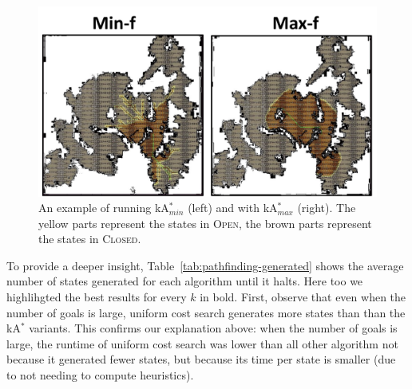 \documentclass{aicom2e}
\newcommand{\kastar}{kA$^*$}
\newcommand{\kastarmin}{kA$^*_{min}$}
\newcommand{\kastarmax}{kA$^*_{max}$}
\newcommand{\open}{\textsc{Open}}
\newcommand{\closed}{\textsc{Closed}}
\begin{document}

\begin{figure}
    \includegraphics[width=\columnwidth]{min-vs-max}
    \caption{An example of running \kastarmin{} (left) and with \kastarmax{} (right). The yellow parts represent the states in \open{}, the brown parts represent the states in \closed{}.}
    \label{fig:min-vs-max}
\end{figure}

To provide a deeper insight, Table~\ref{tab:pathfinding-generated} shows the average number of states generated for each algorithm until it halts. Here too we highlihgted the best results for every $k$ in bold.
First, observe that even when the number of goals is large, uniform cost search generates more states than than the \kastar{} variants. This confirms our explanation above: when the number of goals is large, the  runtime of uniform cost search was lower than all other algorithm not because it generated fewer states, but because its time per state is smaller (due to not needing to compute heuristics).
\end{document}
